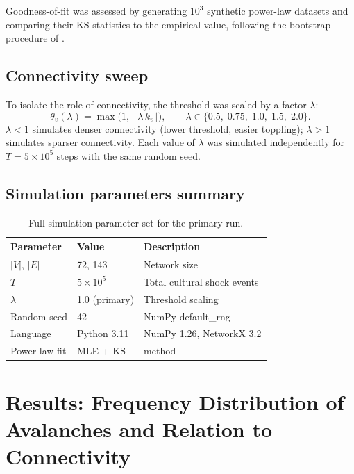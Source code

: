 \documentclass[12pt, a4paper]{article}
\begin{document}
Goodness-of-fit was assessed by generating $10^3$ synthetic
power-law datasets and comparing their KS statistics to the
empirical value, following the bootstrap procedure of
\citet{clauset2009}.

\subsection{Connectivity sweep}

To isolate the role of connectivity, the threshold was scaled
by a factor $\lambda$:
\begin{equation}
  \theta_v(\lambda) = \max\!\bigl(1,\;
  \lfloor \lambda\, k_v \rfloor\bigr), \qquad
  \lambda \in \{0.5,\; 0.75,\; 1.0,\; 1.5,\; 2.0\}.
  \label{eq:sweep}
\end{equation}
$\lambda<1$ simulates denser connectivity (lower threshold,
easier toppling); $\lambda>1$ simulates sparser connectivity.
Each value of $\lambda$ was simulated independently for
$T=5\times10^5$ steps with the same random seed.

\subsection{Simulation parameters summary}

\begin{table}[H]
\centering
\caption{Full simulation parameter set for the primary run.}
\label{tab:simparam}
\small
\begin{tabular}{lll}
\toprule
Parameter & Value & Description \\
\midrule
$|V|$, $|E|$  & 72, 143         & Network size \\
$T$           & $5\times10^5$   & Total cultural shock events \\
$\lambda$     & 1.0 (primary)   & Threshold scaling \\
Random seed   & 42              & NumPy default\_rng \\
Language      & Python 3.11     & NumPy 1.26, NetworkX 3.2 \\
Power-law fit & MLE + KS        & \citet{clauset2009} method \\
\bottomrule
\end{tabular}
\end{table}


\section{Results: Frequency Distribution of Avalanches and
Relation to Connectivity}
\label{sec:results}
\end{document}
